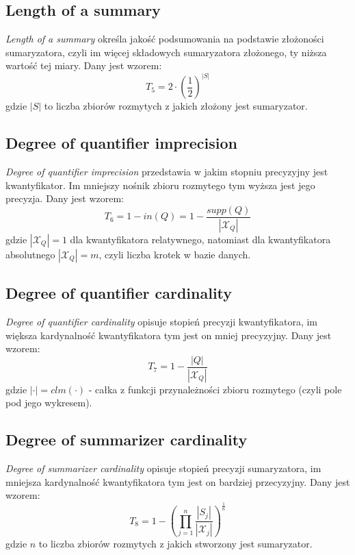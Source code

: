 \documentclass{classrep}
\begin{document}
	\subsection{Length of a summary}
\textsl{Length of a summary}  określa jakość podsumowania na podstawie złożoności sumaryzatora, czyli im więcej składowych sumaryzatora złożonego, ty niższa wartość tej miary. Dany jest wzorem:
\begin{equation}
T_5 = 2 \cdot \left( \frac{1}{2}\right)^{|S|} 
\end{equation}
gdzie $|S|$ to liczba zbiorów rozmytych z jakich złożony jest sumaryzator.


	\subsection{Degree of quantifier imprecision}
\textsl{Degree of quantifier imprecision} przedstawia w jakim stopniu precyzyjny jest kwantyfikator. Im mniejszy nośnik zbioru rozmytego  tym wyższa jest jego precyzja. Dany jest wzorem:
\begin{equation}
T_6 = 1 - in(Q) = 1 - \frac{supp(Q)}{|\mathcal{X}_Q|}
\end{equation}
gdzie $|\mathcal{X}_Q| = 1$ dla kwantyfikatora relatywnego, natomiast dla kwantyfikatora absolutnego $|\mathcal{X}_Q| = m$, czyli liczba krotek w bazie danych.


	\subsection{Degree of quantifier cardinality}
\textsl{Degree of quantifier cardinality} opisuje stopień precyzji kwantyfikatora, im większa kardynalność kwantyfikatora tym jest on mniej precyzyjny. Dany jest wzorem:
\begin{equation}
T_7 = 1 - \frac{|Q|}{|\mathcal{X}_Q|}
\end{equation}
gdzie $|\cdot| = clm(\cdot)$ - całka z funkcji przynależności zbioru rozmytego (czyli pole pod jego wykresem).


	\subsection{Degree of summarizer cardinality}
\textsl{Degree of summarizer cardinality} opisuje stopień precyzji sumaryzatora, im mniejsza kardynalność kwantyfikatora tym jest on bardziej przecyzyjny. Dany jest wzorem:
\begin{equation}
T_8 = 1- \left(\prod_{j=1}^{n} \frac{|S_j|}{|\mathcal{X}_j|}\right)^{\frac{1}{n}}
\end{equation}
gdzie $n$ to liczba zbiorów rozmytych z jakich stworzony jest sumaryzator.
\end{document}
